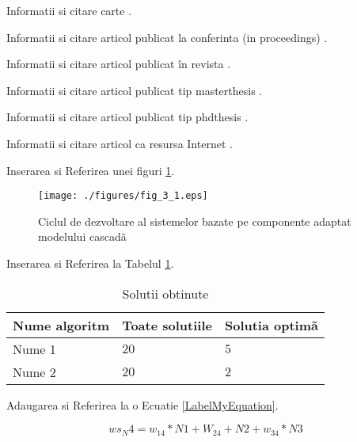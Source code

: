 \indent\par Informatii si citare carte \cite{Sommerville2010}.

Informatii si citare articol publicat la conferinta (in proceedings) \cite{Narayan2012}.

Informatii si citare articol publicat în revista \cite{Robbes2015}.

Informatii si citare articol publicat tip masterthesis  \cite{mastersthesis1993}.

Informatii si citare articol publicat tip phdthesis \cite{phdthesis1993}.

Informatii si citare articol ca resursa Internet  \cite{kinaSUR}.




Inserarea si Referirea unei figuri \ref{FigCBSD}.

\begin{figure}[htbp]
	\centering
		\texttt{[image: ./figures/fig\_3\_1.eps]}
	\caption{Ciclul de dezvoltare al sistemelor bazate pe componente adaptat modelului cascadã}
	\label{FigCBSD}
\end{figure}


Inserarea si Referirea la Tabelul \ref{TabelSolutii}. 

\begin{table}[htbp]
\begin{center}
\begin{tabular}
{|p{120pt}|p{120pt}|p{120pt}|}
\hline
 Nume algoritm  &  Toate solutiile &  Solutia optimã\\
\hline 
\hline Nume 1 & $20$ & $5$  \\
\hline Nume 2 & $20$ & $2$  \\
\hline
\end{tabular}
\end{center}
\caption{Solutii obtinute }
\label{TabelSolutii}
\end{table}


Adaugarea si Referirea la o Ecuatie \ref{LabelMyEquation}.


 \begin{equation}
     ws_N4 = w_{14}*N1 + W_{24}+N2 + w_{34}*N3
\label{LabelMyEquation}
 \end{equation}